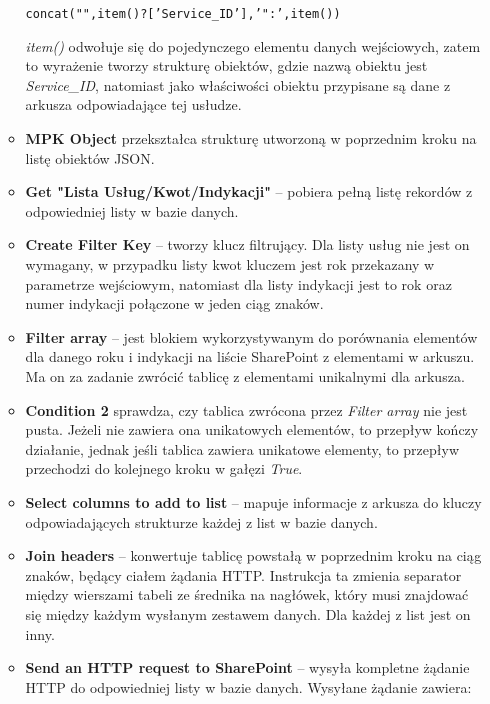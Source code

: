 \begin{enumerate}
\begin{itemize}[label=\textasteriskcentered]
                    \begin{center}
                        \texttt{concat("",item()?['Service\_ID'],'":',item())}
                    \end{center}

                    \emph{item()} odwołuje się do pojedynczego elementu danych wejściowych, zatem to wyrażenie tworzy strukturę obiektów, gdzie nazwą obiektu jest \emph{Service\_ID}, natomiast jako właściwości obiektu przypisane są dane z arkusza odpowiadające tej usłudze.
              \item \textbf{MPK Object} przekształca strukturę utworzoną w poprzednim kroku na listę obiektów JSON.
          \end{itemize}

          \begin{itemize}
              \item\textbf{Get "Lista Usług/Kwot/Indykacji"} -- pobiera pełną listę rekordów z odpowiedniej listy w bazie danych.
              \item \textbf{Create Filter Key} -- tworzy klucz filtrujący. Dla listy usług nie jest on wymagany, w przypadku listy kwot kluczem jest rok przekazany w parametrze wejściowym, natomiast dla listy indykacji jest to rok oraz numer indykacji połączone w jeden ciąg znaków.
              \item \textbf{Filter array} -- jest blokiem wykorzystywanym do porównania elementów dla danego roku i indykacji na liście SharePoint z elementami w arkuszu. Ma on za zadanie zwrócić tablicę z elementami unikalnymi dla arkusza.
              \item \textbf{Condition 2} sprawdza, czy tablica zwrócona przez \emph{Filter array} nie jest pusta. Jeżeli nie zawiera ona unikatowych elementów, to przepływ kończy działanie, jednak jeśli tablica zawiera unikatowe elementy, to przepływ przechodzi do kolejnego kroku w gałęzi \emph{True}.
              \item \textbf{Select columns to add to list} -- mapuje informacje z arkusza do kluczy odpowiadających strukturze każdej z list w bazie danych.
              \item \textbf{Join headers} -- konwertuje tablicę powstałą w poprzednim kroku na ciąg znaków, będący ciałem żądania HTTP. Instrukcja ta zmienia separator między wierszami tabeli ze średnika na nagłówek, który musi znajdować się między każdym wysłanym zestawem danych. Dla każdej z list jest on inny.
              \item \textbf{Send an HTTP request to SharePoint} -- wysyła kompletne żądanie HTTP do odpowiedniej listy w bazie danych. Wysyłane żądanie zawiera:

\end{itemize}
\end{enumerate}
